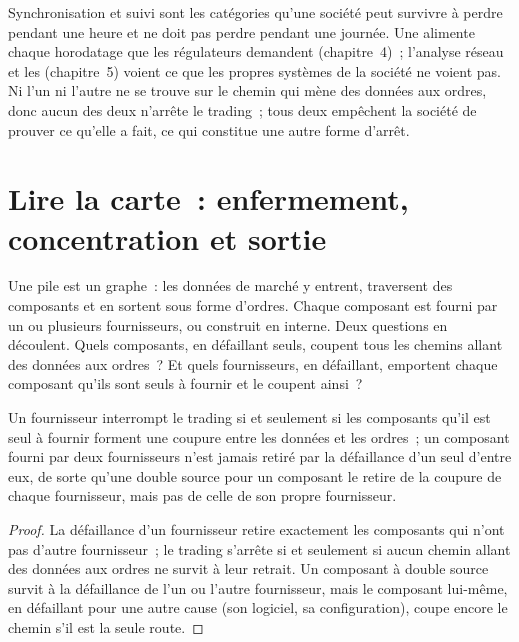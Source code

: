 Synchronisation et suivi sont les catégories qu'une société peut survivre à perdre pendant une heure et ne doit pas perdre pendant une journée. Une 
alimente chaque horodatage que les régulateurs demandent (chapitre~4)~; l'analyse réseau et les  (chapitre~5) voient ce que les propres systèmes
de la société ne voient pas. Ni l'un ni l'autre ne se trouve sur le chemin qui mène des données aux ordres, donc aucun des deux n'arrête le trading~; tous deux empêchent
la société de prouver ce qu'elle a fait, ce qui constitue une autre forme d'arrêt.

\section{Lire la carte~: enfermement, concentration et sortie}

Une pile est un graphe~: les données de marché y entrent, traversent des composants et en sortent sous forme d'ordres. Chaque composant est fourni par un ou
plusieurs fournisseurs, ou construit en interne. Deux questions en découlent. Quels composants, en défaillant seuls, coupent tous les chemins allant des données aux ordres~? Et
quels fournisseurs, en défaillant, emportent chaque composant qu'ils sont seuls à fournir et le coupent ainsi~?

\label{lst:nw:the-vendor-map:graph}

\begin{proposition}\label{prop:nw:the-vendor-map:vendors}
Un fournisseur interrompt le trading si et seulement si les composants qu'il est seul à fournir forment une coupure entre les données et les ordres~; un composant fourni par
deux fournisseurs n'est jamais retiré par la défaillance d'un seul d'entre eux, de sorte qu'une double source pour un composant le retire de la coupure de chaque fournisseur, mais pas de
celle de son propre fournisseur.
\end{proposition}

\begin{proof}
La défaillance d'un fournisseur retire exactement les composants qui n'ont pas d'autre fournisseur~; le trading s'arrête si et seulement si aucun chemin allant des données aux
ordres ne survit à leur retrait. Un composant à double source survit à la défaillance de l'un ou l'autre fournisseur, mais le composant lui-même, en défaillant pour
une autre cause (son logiciel, sa configuration), coupe encore le chemin s'il est la seule route.
\end{proof}


